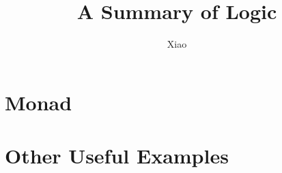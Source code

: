 \documentclass[12pt,a4paper]{report}
\theoremstyle{definition}
\theoremstyle{plain}
\theoremstyle{case}
\theoremstyle{remark}
\begin{document}
\title{A Summary of Logic}
\author{Xiao}
\date{}
\maketitle

\tableofcontents






\chapter{Monad}
\label{monad}

\chapter{Other Useful Examples}
\label{monad-examples}

\appendix




\end{document}
